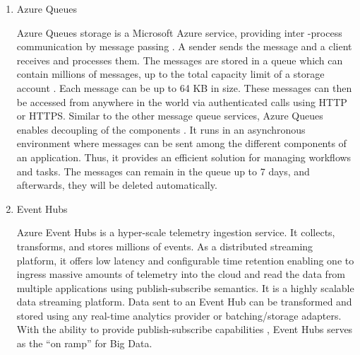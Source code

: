 \begin{enumerate}
\item {} 
Azure Queues

Azure Queues storage is a Microsoft Azure service, providing inter
-process communication by message passing
\label{\detokenize{i524/technologies:id334}}{\hyperref[\detokenize{i524/technologies:silberschatz1998operating}]{\sphinxcrossref{{[}285{]}}}}.  A sender sends the message
and a client receives and processes them.  The messages are
stored in a queue which can contain millions of messages, up to
the total capacity limit of a storage account
\label{\detokenize{i524/technologies:id335}}{\hyperref[\detokenize{i524/technologies:www-azurequeue-web}]{\sphinxcrossref{{[}286{]}}}}.  Each message can be up to 64 KB in
size. These messages can then be accessed from anywhere in the
world via authenticated calls using HTTP or HTTPS. Similar to the
other message queue services, Azure Queues enables decoupling of
the components \label{\detokenize{i524/technologies:id336}}{\hyperref[\detokenize{i524/technologies:www-tutorialspoint}]{\sphinxcrossref{{[}287{]}}}}. It runs in an
asynchronous environment where messages can be sent among the
different components of an application. Thus, it provides an
efficient solution for managing workflows and tasks. The messages
can remain in the queue up to 7 days, and afterwards, they will
be deleted automatically.

\item {} 
Event Hubs

Azure Event Hubs is a hyper-scale telemetry ingestion service. It
collects, transforms, and stores millions of events. As a
distributed streaming platform, it offers low latency and
configurable time retention enabling one to ingress massive
amounts of telemetry into the cloud and read the data from
multiple applications using publish-subscribe
semantics. \label{\detokenize{i524/technologies:id337}}{\hyperref[\detokenize{i524/technologies:www-eventhubs}]{\sphinxcrossref{{[}288{]}}}} It is a highly scalable data
streaming platform. Data sent to an Event Hub can be transformed
and stored using any real-time analytics provider or
batching/storage adapters. With the ability to provide
publish-subscribe capabilities , Event Hubs serves as the ``on
ramp'' for Big Data.

\end{enumerate}


